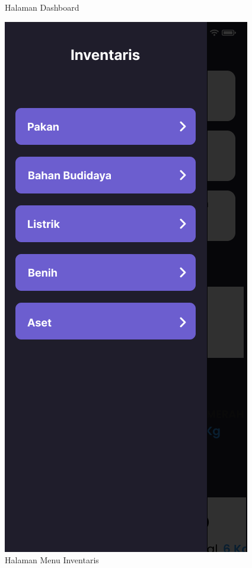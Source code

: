 \begin{spacing}{1.5}
\begin{figure}[H]
			\caption{Halaman Dashboard}
		\endminipage\hfill
			\includegraphics[width=\linewidth]{gambar/sprint1/mockup_home.png}
			\caption{Halaman Menu Inventaris}
		\endminipage
		\hspace{.05\linewidth}
	\end{figure}


\end{spacing}
